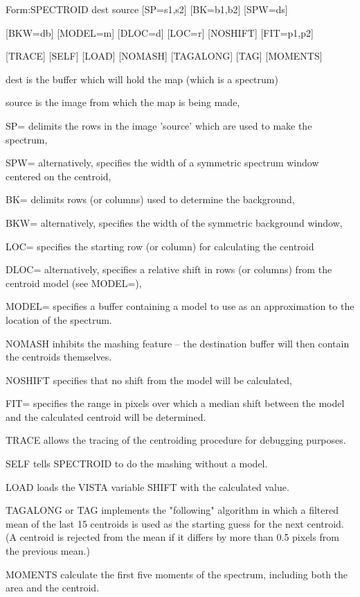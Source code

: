 {\newpage\clearpage
{}%
\begin{command}
  \item[Form:SPECTROID dest source {[SP=s1,s2]} {[BK=b1,b2]} 
       {[SPW=ds]}\hfill]{}
  \item{{[BKW=db]} {[MODEL=m]} {[DLOC=d]} {[LOC=r]} {[NOSHIFT]} {[FIT=p1,p2]}}
  \item{{[TRACE]} {[SELF]} {[LOAD]} {[NOMASH]} {[TAGALONG]} {[TAG]} 
       {[MOMENTS]}}
  \item[dest]{is the buffer which will hold the map (which is a spectrum)}
  \item[source]{is the image from which the map is being made,}
  \item[SP=]{delimits the rows in the image 'source' which
       are used to make the spectrum,}
  \item[SPW=]{alternatively, specifies the width of a
       symmetric spectrum window centered on the centroid,}
  \item[BK=]{delimits rows (or columns) used to determine the background,}
  \item[BKW=]{alternatively, specifies the width of the
       symmetric background window,}
  \item[LOC=]{specifies the starting row (or column) for calculating
       the centroid}
  \item[DLOC=]{alternatively, specifies a relative shift in
       rows (or columns) from the centroid model (see MODEL=),}
  \item[MODEL=]{specifies a buffer containing a model to
       use as an approximation to the location of the spectrum.}
  \item[NOMASH]{inhibits the mashing feature -- the destination
       buffer will then contain the centroids themselves.}
  \item[NOSHIFT]{specifies that no shift from the model will be calculated,}
  \item[FIT=]{specifies the range in pixels over which a
       median shift between the model and the calculated centroid will 
       be determined.}
  \item[TRACE]{allows the tracing of the centroiding procedure
       for debugging purposes.}
  \item[SELF]{tells SPECTROID to do the mashing without a model.}
  \item[LOAD]{loads the VISTA variable SHIFT with the calculated value.}
  \item[TAGALONG or TAG]{implements the "following" algorithm in which a
       filtered mean of the last 15 centroids is used as the starting guess
       for the next centroid.  (A centroid is rejected from the mean if it
       differs by more than 0.5 pixels from the previous mean.)}
  \item[MOMENTS]{calculate the first five moments of the spectrum,
       including both the area and the centroid.}
\end{command}%
\lthtmlfigureZ
\lthtmlcheckvsize\clearpage}

